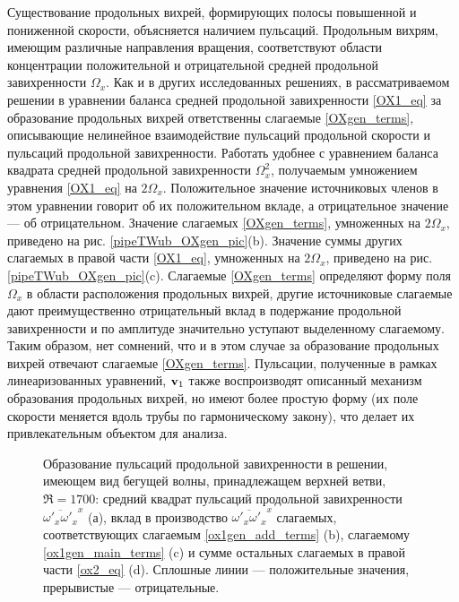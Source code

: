 Существование продольных вихрей, формирующих полосы повышенной и пониженной скорости, объясняется наличием пульсаций. Продольным вихрям, имеющим различные направления вращения, соответствуют области концентрации положительной и отрицательной средней продольной завихренности $\Omega_x$. Как и в других исследованных решениях, в рассматриваемом решении в уравнении баланса средней продольной завихренности \eqref{OX1_eq} за образование продольных вихрей ответственны слагаемые \eqref{OXgen_terms}, описывающие нелинейное взаимодействие пульсаций продольной скорости и пульсаций продольной завихренности. Работать удобнее с уравнением баланса квадрата средней продольной завихренности $\Omega_x^2$, получаемым умножением уравнения \eqref{OX1_eq} на $2\Omega_x$. Положительное значение источниковых членов в этом уравнении говорит об их положительном вкладе, а отрицательное значение --- об отрицательном. Значение слагаемых \eqref{OXgen_terms}, умноженных на $2\Omega_x$, приведено на рис. \ref{pipeTWub_OXgen_pic}(b). Значение суммы других слагаемых в правой части \eqref{OX1_eq}, умноженных на $2\Omega_x$, приведено на рис. \ref{pipeTWub_OXgen_pic}(c). Слагаемые \eqref{OXgen_terms} определяют форму поля $\Omega_x$ в области расположения продольных вихрей, другие источниковые слагаемые дают преимущественно отрицательный вклад в подержание продольной завихренности и по амплитуде значительно уступают выделенному слагаемому. Таким образом, нет сомнений, что и в этом случае за образование продольных вихрей отвечают слагаемые \eqref{OXgen_terms}. Пульсации, полученные в рамках линеаризованных уравнений, $\mathbf{v}_1$ также воспроизводят описанный механизм образования продольных вихрей, но имеют более простую форму (их поле скорости меняется вдоль трубы по гармоническому закону), что делает их привлекательным объектом для анализа. 

\begin{figure}[h]
\caption{Образование пульсаций продольной завихренности в решении, имеющем вид бегущей волны, принадлежащем верхней ветви, $\Re = 1700$: средний квадрат пульсаций продольной завихренности $\overline{\omega'_x \omega'_x }^x$ (а), вклад в производство $\overline{\omega'_x \omega'_x }^x$ слагаемых, соответствующих слагаемым \eqref{ox1gen_add_terms} (b), слагаемому \eqref{ox1gen_main_terms} (c) и сумме остальных слагаемых в правой части \eqref{ox2_eq} (d). Сплошные линии --- положительные значения, прерывистые --- отрицательные.}
\label{pipeTWub_ox1gen_pic}
\end{figure}

